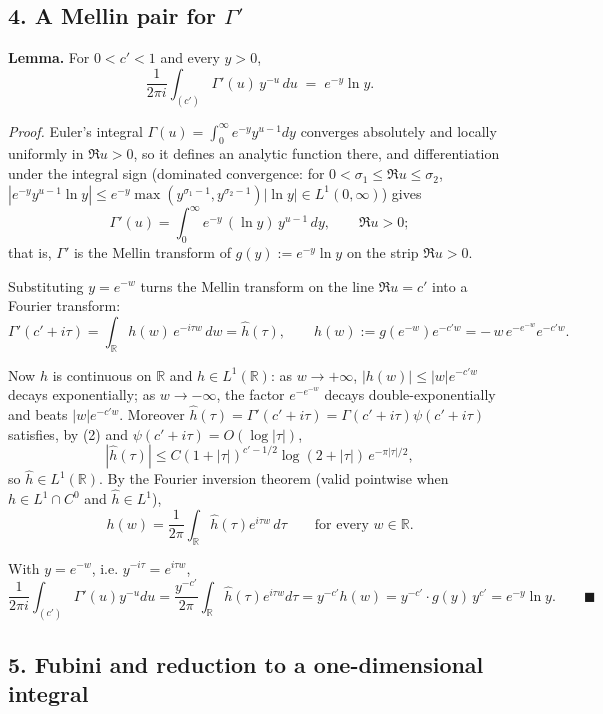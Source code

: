 \documentclass[11pt]{article}
\theoremstyle{remark}
\begin{document}
\subsection*{4. A Mellin pair for $\Gamma'$}

\textbf{Lemma.} For $0<c'<1$ and every $y>0$,
\begin{equation*}
\frac{1}{2\pi i}\int_{(c')}\Gamma'(u)\,y^{-u}\,du\;=\;e^{-y}\ln y . \tag{6}
\end{equation*}

\emph{Proof.} Euler's integral $\Gamma(u)=\int_0^\infty e^{-y}y^{u-1}dy$ converges absolutely and locally uniformly in $\Re u>0$, so it defines an analytic function there, and differentiation under the integral sign (dominated convergence: for $0<\sigma_1\le\Re u\le\sigma_2$, $|e^{-y}y^{u-1}\ln y|\le e^{-y}\max(y^{\sigma_1-1},y^{\sigma_2-1})|\ln y|\in L^1(0,\infty)$) gives
\[
\Gamma'(u)=\int_0^\infty e^{-y}\,(\ln y)\,y^{u-1}\,dy,\qquad \Re u>0;
\]
that is, $\Gamma'$ is the Mellin transform of $g(y):=e^{-y}\ln y$ on the strip $\Re u>0$.

Substituting $y=e^{-w}$ turns the Mellin transform on the line $\Re u=c'$ into a Fourier transform:
\[
\Gamma'(c'+i\tau)=\int_{\mathbb R}h(w)\,e^{-i\tau w}\,dw=\widehat h(\tau),
\qquad h(w):=g(e^{-w})e^{-c'w}=-\,w\,e^{-e^{-w}}e^{-c'w}.
\]

Now $h$ is continuous on $\mathbb R$ and $h\in L^1(\mathbb R)$: as $w\to+\infty$, $|h(w)|\le|w|e^{-c'w}$ decays exponentially; as $w\to-\infty$, the factor $e^{-e^{-w}}$ decays double-exponentially and beats $|w|e^{-c'w}$. Moreover $\widehat h(\tau)=\Gamma'(c'+i\tau)=\Gamma(c'+i\tau)\psi(c'+i\tau)$ satisfies, by (2) and $\psi(c'+i\tau)=O(\log|\tau|)$,
\[
|\widehat h(\tau)|\le C(1+|\tau|)^{c'-1/2}\log(2+|\tau|)\,e^{-\pi|\tau|/2},
\]
so $\widehat h\in L^1(\mathbb R)$. By the Fourier inversion theorem (valid pointwise when $h\in L^1\cap C^0$ and $\widehat h\in L^1$),
\[
h(w)=\frac{1}{2\pi}\int_{\mathbb R}\widehat h(\tau)e^{i\tau w}\,d\tau\qquad\text{for every }w\in\mathbb R .
\]

With $y=e^{-w}$, i.e. $y^{-i\tau}=e^{i\tau w}$,
\[
\frac{1}{2\pi i}\int_{(c')}\Gamma'(u)y^{-u}du
=\frac{y^{-c'}}{2\pi}\int_{\mathbb R}\widehat h(\tau)e^{i\tau w}d\tau
=y^{-c'}h(w)=y^{-c'}\cdot g(y)\,y^{c'}=e^{-y}\ln y. \qquad\blacksquare
\]

\subsection*{5. Fubini and reduction to a one-dimensional integral}
\end{document}
